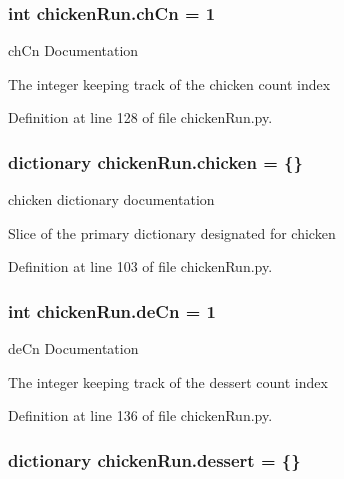 \hypertarget{namespacechickenRun_acdfc38f739dc10186f85d7faa007ffa0}{
\subsubsection[{ch\-Cn}]{\setlength{\rightskip}{0pt plus 5cm}int chicken\-Run.\-ch\-Cn = 1}}\label{namespacechickenRun_acdfc38f739dc10186f85d7faa007ffa0}


ch\-Cn Documentation 

The integer keeping track of the chicken count index 

Definition at line 128 of file chicken\-Run.\-py.

\hypertarget{namespacechickenRun_aaf44cce0aa0e8651a59c90c3b5be4387}{
\subsubsection[{chicken}]{\setlength{\rightskip}{0pt plus 5cm}dictionary chicken\-Run.\-chicken = \{\}}}\label{namespacechickenRun_aaf44cce0aa0e8651a59c90c3b5be4387}


chicken dictionary documentation 

Slice of the primary dictionary designated for chicken 

Definition at line 103 of file chicken\-Run.\-py.

\hypertarget{namespacechickenRun_a7fb9b34913f96eda593406140ef27911}{
\subsubsection[{de\-Cn}]{\setlength{\rightskip}{0pt plus 5cm}int chicken\-Run.\-de\-Cn = 1}}\label{namespacechickenRun_a7fb9b34913f96eda593406140ef27911}


de\-Cn Documentation 

The integer keeping track of the dessert count index 

Definition at line 136 of file chicken\-Run.\-py.

\hypertarget{namespacechickenRun_a4f824564a37f3bdaa99f71ff89d1e491}{
\subsubsection[{dessert}]{\setlength{\rightskip}{0pt plus 5cm}dictionary chicken\-Run.\-dessert = \{\}}}\label{namespacechickenRun_a4f824564a37f3bdaa99f71ff89d1e491}


